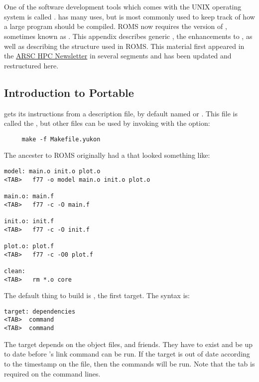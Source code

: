 \section{}
\label{Gmake}
One of the software development tools which comes with the UNIX
operating system is called .  has many uses,
but is most commonly used to keep track of how a large program
should be compiled. ROMS now requires the  version of 
, sometimes known as  \citep{GMAKE}.
This appendix describes generic , the 
enhancements to , as well as describing the
 structure used in ROMS. This material first
appeared in the \href{http://www.arsc.edu/support/news/HPCnews.shtml}{ARSC
HPC Newsletter} in several segments and has been updated and restructured
here.

\subsection{Introduction to Portable }

 gets its instructions from a description file, by default named
 or . This file is called the
, but other files
can be used by invoking  with the  option:
\begin{verbatim}
     make -f Makefile.yukon
\end{verbatim}

The ancester to ROMS originally had a  that looked
something like:
\begin{verbatim}
model: main.o init.o plot.o
<TAB>   f77 -o model main.o init.o plot.o

main.o: main.f
<TAB>   f77 -c -O main.f

init.o: init.f
<TAB>   f77 -c -O init.f

plot.o: plot.f
<TAB>   f77 -c -O0 plot.f

clean:
<TAB>   rm *.o core
\end{verbatim}
The default thing to build is , the first target. The syntax
is:
\begin{verbatim}
target: dependencies
<TAB>  command
<TAB>  command
\end{verbatim}
The target  depends on the object files, 
and friends. They have to exist and be up to date before 's link
command can be run. If the target is out of date according to the
timestamp on the file, then the commands will
be run. Note that the tab is required on the command lines.

